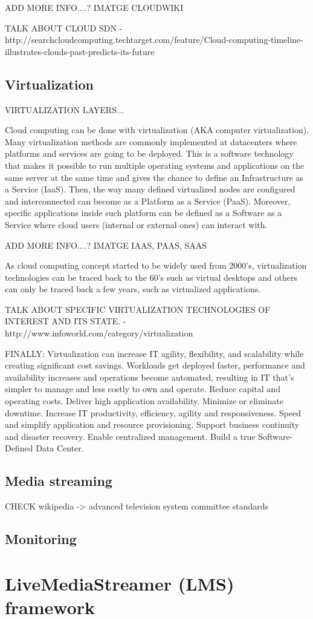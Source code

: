 ADD MORE INFO....? IMATGE CLOUDWIKI

TALK ABOUT CLOUD SDN - http://searchcloudcomputing.techtarget.com/feature/Cloud-computing-timeline-illustrates-clouds-past-predicts-its-future

\subsection{Virtualization}

VIRTUALIZATION LAYERS...

Cloud computing can be done with virtualization (AKA computer virtualization). Many virtualization methods are commonly implemented at datacenters where platforms and services are going to be deployed. This is a software technology that makes it possible to run multiple operating systems and applications on the same server at the same time and gives the chance to define an Infrastructure as a Service (IaaS). Then, the way many defined virtualized nodes are configured and interconnected can become as a Platform as a Service (PaaS). Moreover, specific applications inside such platform can be defined as a Software as a Service where cloud users (internal or external ones) can interact with.

ADD MORE INFO....? IMATGE IAAS, PAAS, SAAS

As cloud computing concept started to be widely used from 2000's, virtualization  technologies can be traced back to the 60’s such as virtual desktops and others can only be traced back a few years, such as virtualized applications.

TALK ABOUT SPECIFIC VIRTUALIZATION TECHNOLOGIES OF INTEREST AND ITS STATE. - http://www.infoworld.com/category/virtualization

FINALLY:
Virtualization can increase IT agility, flexibility, and scalability while creating significant cost savings. Workloads get deployed faster, performance and availability increases and operations become automated, resulting in IT that's simpler to manage and less costly to own and operate.
Reduce capital and operating costs.
Deliver high application availability.
Minimize or eliminate downtime.
Increase IT productivity, efficiency, agility and responsiveness.
Speed and simplify application and resource provisioning.
Support business continuity and disaster recovery.
Enable centralized management.
Build a true Software-Defined Data Center.

\subsection{Media streaming}

CHECK wikipedia -> advanced television system committee standards

\subsection{Monitoring}


\section{LiveMediaStreamer (LMS) framework}







